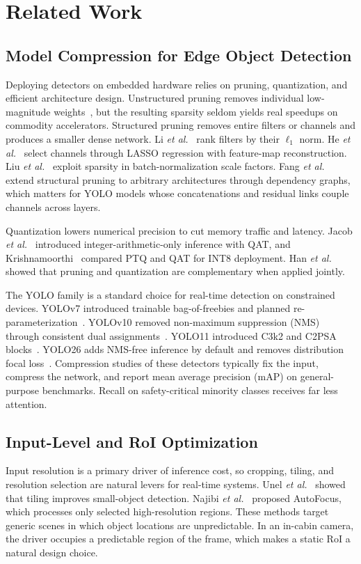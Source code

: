 \documentclass[conference]{IEEEtran}
\begin{document}
\section{Related Work}

\subsection{Model Compression for Edge Object Detection}
Deploying detectors on embedded hardware relies on pruning, quantization, and efficient architecture design. Unstructured pruning removes individual low-magnitude weights~\cite{b8}, but the resulting sparsity seldom yields real speedups on commodity accelerators. Structured pruning removes entire filters or channels and produces a smaller dense network. Li \emph{et al.}~\cite{b9} rank filters by their $\ell_1$ norm. He \emph{et al.}~\cite{b10} select channels through LASSO regression with feature-map reconstruction. Liu \emph{et al.}~\cite{b11} exploit sparsity in batch-normalization scale factors. Fang \emph{et al.}~\cite{b12} extend structural pruning to arbitrary architectures through dependency graphs, which matters for YOLO models whose concatenations and residual links couple channels across layers.

Quantization lowers numerical precision to cut memory traffic and latency. Jacob \emph{et al.}~\cite{b13} introduced integer-arithmetic-only inference with QAT, and Krishnamoorthi~\cite{b14} compared PTQ and QAT for INT8 deployment. Han \emph{et al.}~\cite{b8} showed that pruning and quantization are complementary when applied jointly.

The YOLO family is a standard choice for real-time detection on constrained devices. YOLOv7 introduced trainable bag-of-freebies and planned re-parameterization~\cite{b15}. YOLOv10 removed non-maximum suppression (NMS) through consistent dual assignments~\cite{b16}. YOLO11 introduced C3k2 and C2PSA blocks~\cite{b17}. YOLO26 adds NMS-free inference by default and removes distribution focal loss~\cite{b26}. Compression studies of these detectors typically fix the input, compress the network, and report mean average precision (mAP) on general-purpose benchmarks. Recall on safety-critical minority classes receives far less attention.

\subsection{Input-Level and RoI Optimization}
Input resolution is a primary driver of inference cost, so cropping, tiling, and resolution selection are natural levers for real-time systems. Unel \emph{et al.}~\cite{b18} showed that tiling improves small-object detection. Najibi \emph{et al.}~\cite{b19} proposed AutoFocus, which processes only selected high-resolution regions. These methods target generic scenes in which object locations are unpredictable. In an in-cabin camera, the driver occupies a predictable region of the frame, which makes a static RoI a natural design choice.
\end{document}
